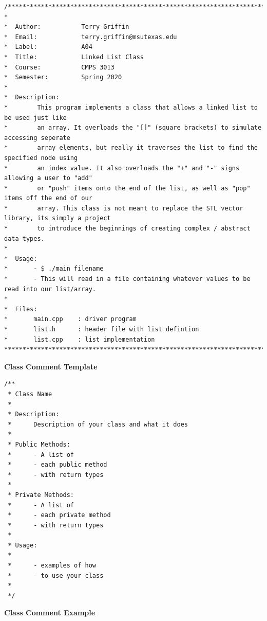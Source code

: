 \begin{verbatim}
/*****************************************************************************
*                    
*  Author:           Terry Griffin
*  Email:            terry.griffin@msutexas.edu
*  Label:            A04
*  Title:            Linked List Class
*  Course:           CMPS 3013
*  Semester:         Spring 2020
* 
*  Description:
*        This program implements a class that allows a linked list to be used just like 
*        an array. It overloads the "[]" (square brackets) to simulate accessing seperate 
*        array elements, but really it traverses the list to find the specified node using
*        an index value. It also overloads the "+" and "-" signs allowing a user to "add"
*        or "push" items onto the end of the list, as well as "pop" items off the end of our 
*        array. This class is not meant to replace the STL vector library, its simply a project
*        to introduce the beginnings of creating complex / abstract data types. 
*        
*  Usage: 
*       - $ ./main filename
*       - This will read in a file containing whatever values to be read into our list/array. 
*       
*  Files:            
*       main.cpp    : driver program 
*       list.h      : header file with list defintion
*       list.cpp    : list implementation
*****************************************************************************/
\end{verbatim}


\textbf{Class Comment Template}\\

\begin{verbatim}
/**
 * Class Name
 * 
 * Description:
 *      Description of your class and what it does
 * 
 * Public Methods:
 *      - A list of 
 *      - each public method
 *      - with return types
 * 
 * Private Methods:
 *      - A list of 
 *      - each private method
 *      - with return types
 * 
 * Usage: 
 * 
 *      - examples of how
 *      - to use your class 
 *      
 */
\end{verbatim}

\textbf{Class Comment Example}

